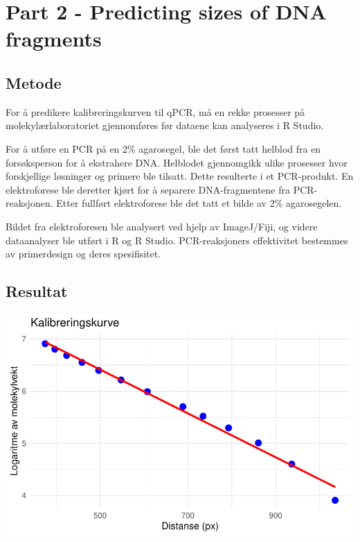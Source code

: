 \documentclass[
  letterpaper,
  DIV=11,
  numbers=noendperiod]{scrreprt}
\begin{document}
\section{Part 2 - Predicting sizes of DNA
fragments}\label{part-2---predicting-sizes-of-dna-fragments}

\subsection{Metode}\label{metode-3}

For å predikere kalibreringskurven til qPCR, må en rekke prosesser på
molekylærlaboratoriet gjennomføres før dataene kan analyseres i R
Studio.

For å utføre en PCR på en 2\% agarosegel, ble det først tatt helblod fra
en forsøksperson for å ekstrahere DNA. Helblodet gjennomgikk ulike
prosesser hvor forskjellige løsninger og primere ble tilsatt. Dette
resulterte i et PCR-produkt. En elektroforese ble deretter kjørt for å
separere DNA-fragmentene fra PCR-reaksjonen. Etter fullført
elektroforese ble det tatt et bilde av 2\% agarosegelen.

Bildet fra elektroforesen ble analysert ved hjelp av ImageJ/Fiji, og
videre dataanalyser ble utført i R og R Studio. PCR-reaksjoners
effektivitet bestemmes av primerdesign og deres spesifisitet.

\subsection{Resultat}\label{resultat-2}

\includegraphics{02-regression-models_files/figure-pdf/unnamed-chunk-3-1.pdf}

\begingroup\fontsize{10}{12}\selectfont
\end{document}
